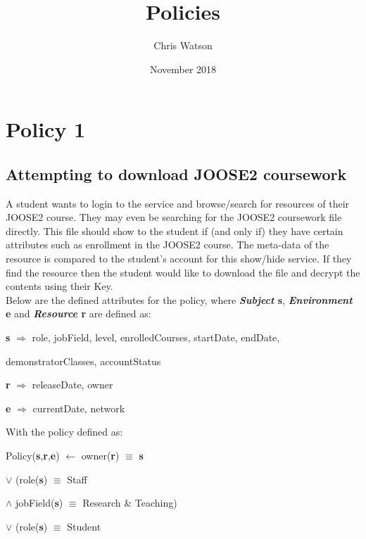 \documentclass[a4paper,11pt]{article}
\title{Policies}
\author{Chris Watson}
\date{November 2018}
\begin{document}
\maketitle

\setcounter{secnumdepth}{1}

\section{Policy 1}
\subsection{Attempting to download JOOSE2 coursework}
A student wants to login to the service and browse/search for resources of their JOOSE2 course. They may even be searching for the JOOSE2 coursework file directly. This file should show to the student if (and only if) they have certain attributes such as enrollment in the JOOSE2 course. The meta-data of the resource is compared to the student's account for this show/hide service. If they find the resource then the student would like to download the file and decrypt the contents using their Key.\\
Below are the defined attributes for the policy, where \textbf{\emph{Subject} s}, \textbf{\emph{Environment} e} and \textbf{\emph{Resource} r} are defined as:\\\par
\textbf{s} $\Rightarrow$ role, jobField, level, enrolledCourses, startDate, endDate,\par
\hspace{0.8cm}demonstratorClasses, accountStatus\par
\textbf{r} $\Rightarrow$ releaseDate, owner\par
\textbf{e} $\Rightarrow$ currentDate, network\\\par
\noindent With the policy defined as:\\\par
Policy(\textbf{s},\textbf{r},\textbf{e}) $\leftarrow$ owner(\textbf{r}) $\equiv$ \textbf{s}\par
\hspace{2.3cm}$\vee{}$ (role(\textbf{s}) $\equiv$ Staff\par
\hspace{2.8cm}$\wedge{}$ jobField(\textbf{s}) $\equiv$ Research \& Teaching)\par
\hspace{2.3cm}$\vee{}$ (role(\textbf{s}) $\equiv$ Student\par
\end{document}
